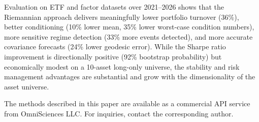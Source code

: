 \documentclass[12pt,a4paper]{article}
\begin{document}
Evaluation on ETF and factor datasets over 2021--2026 shows that the
Riemannian approach delivers meaningfully lower portfolio turnover (36\%),
better conditioning (10\% lower mean, 35\% lower worst-case condition
numbers), more sensitive regime detection (33\% more events detected), and
more accurate covariance forecasts (24\% lower geodesic error). While the
Sharpe ratio improvement is directionally positive (92\% bootstrap
probability) but economically modest on a 10-asset long-only universe,
the stability and risk management advantages are substantial and grow
with the dimensionality of the asset universe.

The methods described in this paper are available as a commercial API
service from OmniSciences LLC. For inquiries, contact the corresponding
author.



\end{document}
